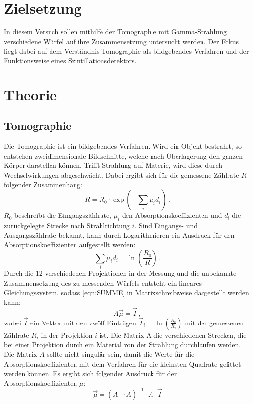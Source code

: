 \section{Zielsetzung}
In diesem Versuch sollen mithilfe der Tomographie mit Gamma-Strahlung verschiedene Würfel auf ihre Zusammensetzung untersucht werden.
Der Fokus liegt dabei auf dem Verständnis Tomographie als bildgebendes Verfahren und der Funktionsweise eines Szintillationsdetektors.

\section{Theorie}
\label{sec:Theorie}

\subsection{Tomographie}
Die Tomographie ist ein bildgebendes Verfahren.
Wird ein Objekt bestrahlt, so entstehen zweidimensionale Bildschnitte, welche nach Überlagerung den ganzen Körper darstellen können.
Trifft Strahlung auf Materie, wird diese durch Wechselwirkungen abgeschwächt.
Dabei ergibt sich für die gemessene Zählrate $R$ folgender Zusammenhang:
\begin{equation}
    R = R_0 \cdot \exp{(- \sum_{i} \mu_i d_i)} \, .
\end{equation}
$R_0$ beschreibt die Eingangszählrate, $\mu_i$ den Absorptionskoeffizienten und $d_i$ die zurückgelegte Strecke nach Strahlrichtung $i$.
Sind Eingangs- und Ausgangszählrate bekannt, kann durch Logarithmieren ein Ausdruck für den Absorptionskoeffizienten aufgestellt werden:
\begin{equation}
    \sum_{i} \mu_i d_i = \ln\left(\frac{R_0}{R}\right) \, .
    \label{eqn:SUMME}
\end{equation}
Durch die 12 verschiedenen Projektionen in der Messung und die unbekannte Zusammensetzung des zu messenden Würfels 
entsteht ein lineares Gleichungssystem, sodass \eqref{eqn:SUMME} in Matrixschreibweise dargestellt werden kann:
\begin{equation}
    A \vec{\mu} = \vec{I} \, ,
    \label{eqn:matrix}
\end{equation}
wobei $\vec{I}$ ein Vektor mit den zwölf Einträgen $\vec{I}_i = \ln\left(\frac{R_0}{R_i}\right)$ mit der gemessenen Zählrate $R_i$ in der Projektion $i$ ist.
Die Matrix A die verschiedenen Strecken, die bei einer Projektion durch ein Material von der Strahlung durchlaufen werden.
Die Matrix $A$ sollte nicht singulär sein, damit die Werte für die Absorptionskoeffizienten mit dem Verfahren für die kleinsten Quadrate gefittet werden können.
Es ergibt sich folgender Ausdruck für den Absorptionskoeffizienten $\mu$:
\begin{equation*}
    \vec{\mu} = \left( A^\top \cdot A \right)^{-1} \cdot A^\top \vec{I}
\end{equation*}

